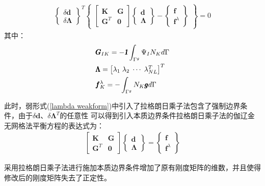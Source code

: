 \begin{equation}
\begin{split}
  \left\{\begin{matrix}\delta\pmb{d}\\\delta\pmb{\Lambda}\end{matrix}\right\}^T
  \left\{\begin{matrix}
  \left[\begin{matrix}\pmb{K}&\pmb{G}\\\pmb{G}^T&\pmb{0}\end{matrix}\right]
  \left\{\begin{matrix}\pmb{d}\\\pmb{\Lambda}\end{matrix}\right\}-
  \left\{\begin{matrix}\pmb{f}\\\pmb{f}^{\lambda}\end{matrix}\right\}
  \end{matrix}\right\}=0
\end{split}
\end{equation}
其中：
\begin{equation}
\begin{split}
    &\pmb{G}_{IK}=-\pmb{\textsl{1}}\int_{\Gamma^g}\Psi_IN_Kd\Gamma\\
    &\pmb{\Lambda}= \left[\begin{matrix}\lambda_1\;\lambda_2\;\dotsb\;\lambda_{NL}^T\end{matrix}\right]^T\\
    &\pmb{f}_K^{\lambda}=-\int_{\Gamma^g}N_K\pmb{g}d\Gamma
\end{split}
\end{equation}\par
此时，弱形式(\ref{lambda weakform})中引入了拉格朗日乘子法包含了强制边界条件，由于$\delta{\pmb{d}}$、$\delta\pmb{\Lambda}^T$的任意性
可以得到引入本质边界条件拉格朗日乘子法的伽辽金无网格法平衡方程的表达式为：
\begin{equation}
\begin{split}
    \left[\begin{matrix}\pmb{K}&\pmb{G}\\\pmb{G}^T&\pmb{0}\end{matrix}\right]
    \left\{\begin{matrix}\pmb{d}\\\pmb{\Lambda}\end{matrix}\right\}=
    \left\{\begin{matrix}\pmb{f}\\\pmb{f}^{\lambda}\end{matrix}\right\}
\end{split}
\end{equation}\par
采用拉格朗日乘子法进行施加本质边界条件增加了原有刚度矩阵的维数，并且使得修改后的刚度矩阵失去了正定性。
